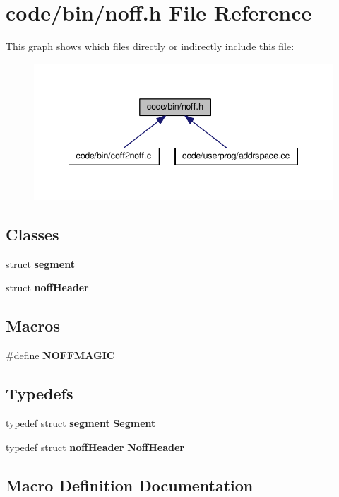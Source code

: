 \section{code/bin/noff.h File Reference}
\label{noff_8h}
This graph shows which files directly or indirectly include this file\+:
\nopagebreak
\begin{figure}[H]
\begin{center}
\leavevmode
\includegraphics[width=342pt]{noff_8h__dep__incl}
\end{center}
\end{figure}
\subsection*{Classes}
\begin{DoxyCompactItemize}
\item 
struct {\bf segment}
\item 
struct {\bf noff\+Header}
\end{DoxyCompactItemize}
\subsection*{Macros}
\begin{DoxyCompactItemize}
\item 
\#define {\bf N\+O\+F\+F\+M\+A\+G\+IC}
\end{DoxyCompactItemize}
\subsection*{Typedefs}
\begin{DoxyCompactItemize}
\item 
typedef struct {\bf segment} {\bf Segment}
\item 
typedef struct {\bf noff\+Header} {\bf Noff\+Header}
\end{DoxyCompactItemize}


\subsection{Macro Definition Documentation}
